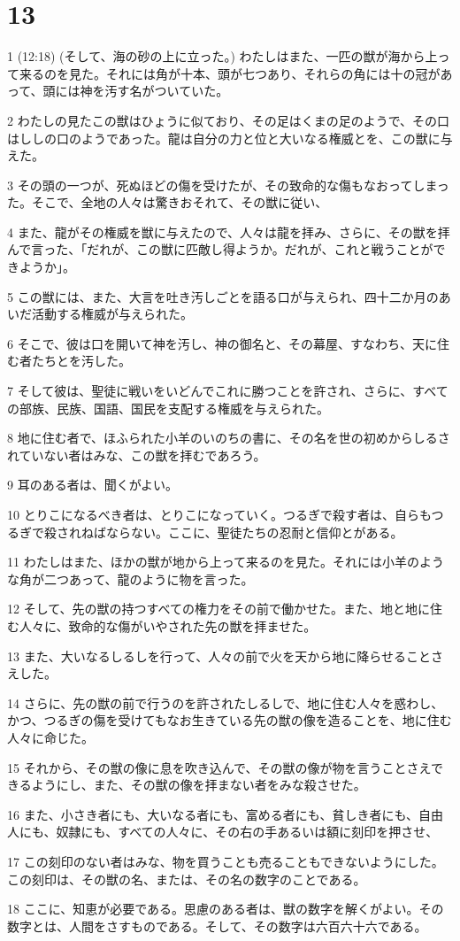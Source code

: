 \chapter{13}

\par 1 (12:18) (そして、海の砂の上に立った。) わたしはまた、一匹の獣が海から上って来るのを見た。それには角が十本、頭が七つあり、それらの角には十の冠があって、頭には神を汚す名がついていた。
\par 2 わたしの見たこの獣はひょうに似ており、その足はくまの足のようで、その口はししの口のようであった。龍は自分の力と位と大いなる権威とを、この獣に与えた。
\par 3 その頭の一つが、死ぬほどの傷を受けたが、その致命的な傷もなおってしまった。そこで、全地の人々は驚きおそれて、その獣に従い、
\par 4 また、龍がその権威を獣に与えたので、人々は龍を拝み、さらに、その獣を拝んで言った、「だれが、この獣に匹敵し得ようか。だれが、これと戦うことができようか」。
\par 5 この獣には、また、大言を吐き汚しごとを語る口が与えられ、四十二か月のあいだ活動する権威が与えられた。
\par 6 そこで、彼は口を開いて神を汚し、神の御名と、その幕屋、すなわち、天に住む者たちとを汚した。
\par 7 そして彼は、聖徒に戦いをいどんでこれに勝つことを許され、さらに、すべての部族、民族、国語、国民を支配する権威を与えられた。
\par 8 地に住む者で、ほふられた小羊のいのちの書に、その名を世の初めからしるされていない者はみな、この獣を拝むであろう。
\par 9 耳のある者は、聞くがよい。
\par 10 とりこになるべき者は、とりこになっていく。つるぎで殺す者は、自らもつるぎで殺されねばならない。ここに、聖徒たちの忍耐と信仰とがある。
\par 11 わたしはまた、ほかの獣が地から上って来るのを見た。それには小羊のような角が二つあって、龍のように物を言った。
\par 12 そして、先の獣の持つすべての権力をその前で働かせた。また、地と地に住む人々に、致命的な傷がいやされた先の獣を拝ませた。
\par 13 また、大いなるしるしを行って、人々の前で火を天から地に降らせることさえした。
\par 14 さらに、先の獣の前で行うのを許されたしるしで、地に住む人々を惑わし、かつ、つるぎの傷を受けてもなお生きている先の獣の像を造ることを、地に住む人々に命じた。
\par 15 それから、その獣の像に息を吹き込んで、その獣の像が物を言うことさえできるようにし、また、その獣の像を拝まない者をみな殺させた。
\par 16 また、小さき者にも、大いなる者にも、富める者にも、貧しき者にも、自由人にも、奴隷にも、すべての人々に、その右の手あるいは額に刻印を押させ、
\par 17 この刻印のない者はみな、物を買うことも売ることもできないようにした。この刻印は、その獣の名、または、その名の数字のことである。
\par 18 ここに、知恵が必要である。思慮のある者は、獣の数字を解くがよい。その数字とは、人間をさすものである。そして、その数字は六百六十六である。

